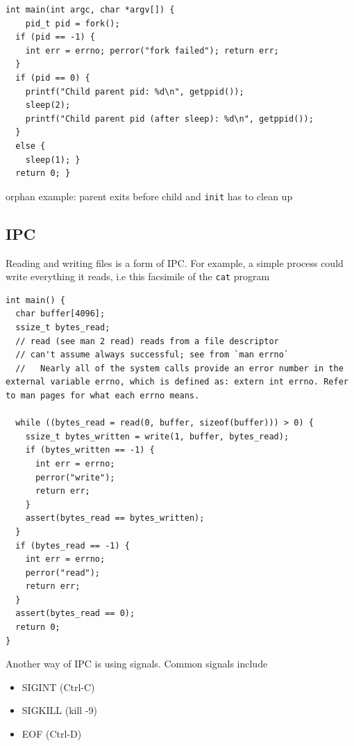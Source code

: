 \documentclass[../notes.tex]{subfiles}
\begin{document}
\begin{listing}[H]
\begin{verbatim}
int main(int argc, char *argv[]) {
    pid_t pid = fork();
  if (pid == -1) {
    int err = errno; perror("fork failed"); return err;
  }
  if (pid == 0) {
    printf("Child parent pid: %d\n", getppid());
    sleep(2);
    printf("Child parent pid (after sleep): %d\n", getppid());
  }
  else {
    sleep(1); }
  return 0; }
\end{verbatim}
\caption{orphan example: parent exits before child and \texttt{init} has to clean up}
\end{listing}

\subsection{IPC}

Reading and writing files is a form of IPC. For example, a simple process could write everything it reads, i.e this facsimile of the \texttt{cat} program


\begin{listing}[H]
\begin{verbatim}
int main() {
  char buffer[4096];
  ssize_t bytes_read;
  // read (see man 2 read) reads from a file descriptor
  // can't assume always successful; see from `man errno`
  //   Nearly all of the system calls provide an error number in the external variable errno, which is defined as: extern int errno. Refer to man pages for what each errno means.

  while ((bytes_read = read(0, buffer, sizeof(buffer))) > 0) {
    ssize_t bytes_written = write(1, buffer, bytes_read);
    if (bytes_written == -1) {
      int err = errno;
      perror("write");
      return err;
    }
    assert(bytes_read == bytes_written);
  }
  if (bytes_read == -1) {
    int err = errno;
    perror("read");
    return err;
  }
  assert(bytes_read == 0);
  return 0;
}
\end{verbatim}
\end{listing}


Another way of IPC is using signals. Common signals include

\begin{itemize}
    \item SIGINT (Ctrl-C)
    \item SIGKILL (kill -9)
    \item EOF (Ctrl-D)
\end{itemize}
\end{document}
